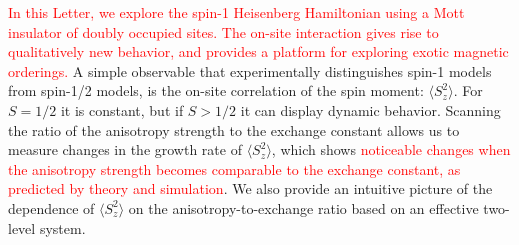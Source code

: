 \documentclass[aps,prl,twocolumn,superscriptaddress]{revtex4-1}
\newcommand{\newmat}[1]{\textcolor{red}{#1}}
\begin{document}
\newmat{In this Letter, we explore the spin-1 Heisenberg Hamiltonian using a Mott insulator of doubly occupied sites. The on-site interaction gives rise to qualitatively new behavior, and provides a platform for exploring exotic magnetic orderings.}
A simple observable that experimentally distinguishes spin-1 models from spin-1/2 models, is the on-site correlation of the spin moment: $\langle S_{z}^2 \rangle$. For $S = 1/2$ it is constant, but if $S > 1/2$ it can display dynamic behavior.
Scanning the ratio of the anisotropy strength to the exchange constant allows us to measure changes in the growth rate of $\langle S_{z}^2 \rangle$, which shows \newmat{noticeable changes when the anisotropy strength becomes comparable to the exchange constant, as predicted by theory and simulation}. We also provide an intuitive picture of the dependence of $\langle S_{z}^2 \rangle$ on the anisotropy-to-exchange ratio based on an effective two-level system. 
\end{document}

